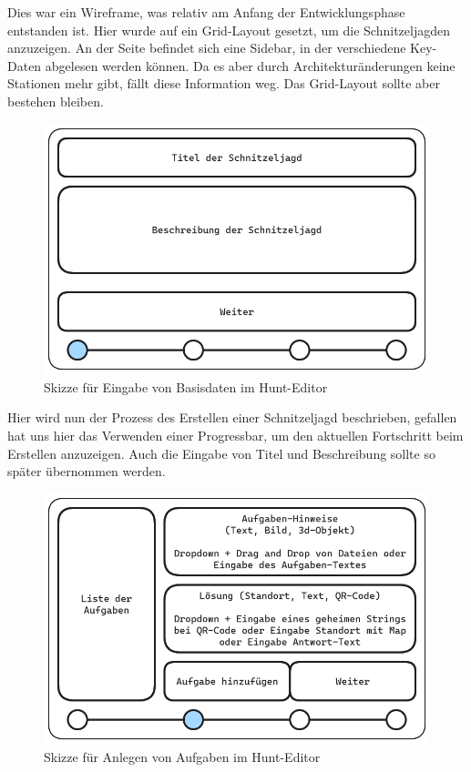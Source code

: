 Dies war ein Wireframe, was relativ am Anfang der Entwicklungsphase entstanden ist. Hier wurde auf ein Grid-Layout gesetzt, um die Schnitzeljagden anzuzeigen. An der Seite befindet sich eine Sidebar, in der verschiedene Key-Daten abgelesen werden können. Da es aber durch Architekturänderungen keine Stationen mehr gibt, fällt diese Information weg. Das Grid-Layout sollte aber bestehen bleiben.

\begin{figure}[H]
  \centering
  \includegraphics[width=1\textwidth]{images/wireframing/PrAr_Scavhunt_Wireframing-2.2.png}
  \caption{Skizze für Eingabe von Basisdaten im Hunt-Editor}
  \label{fig:wireframing-frontend-hunt-editor-4}
\end{figure}

Hier wird nun der Prozess des Erstellen einer Schnitzeljagd beschrieben, gefallen hat uns hier das Verwenden einer Progressbar, um den aktuellen Fortschritt beim Erstellen anzuzeigen. Auch die Eingabe von Titel und Beschreibung sollte so später übernommen werden. 

\begin{figure}[H]
  \centering
  \includegraphics[width=1\textwidth]{images/wireframing/PrAr_Scavhunt_Wireframing-2.3.png}
  \caption{Skizze für Anlegen von Aufgaben im Hunt-Editor}
  \label{fig:wireframing-frontend-hunt-editor-5}
\end{figure}

